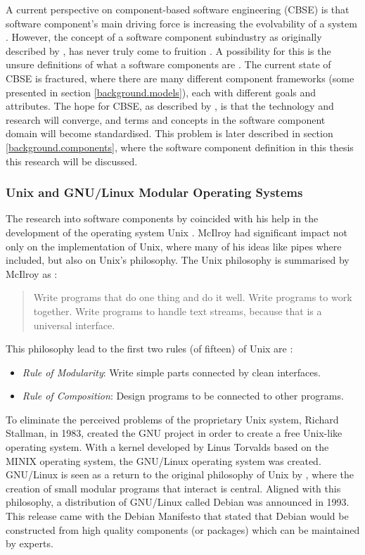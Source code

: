 A current perspective on component-based software engineering (CBSE) is that software component's main driving force is increasing the evolvability of a system \citep{Szyperski2000}.
However, the concept of a software component subindustry as originally described by \cite{McIlroy1969}, has never truly come to fruition \citep{Szyperski2002}.
A possibility for this is the unsure definitions of what a software components are \citep{Crnkovic2011}.
The current state of CBSE is fractured, where there are many different component frameworks (some presented in section \ref{background.models}),
each with different goals and attributes.
The hope for CBSE, as described by \cite{Crnkovic2011}, is that the technology and research will converge, and terms and concepts in the software component domain will become standardised.
This problem is later described in section \ref{background.components}, where the software component definition in this thesis this research will be discussed.

\subsubsection{Unix and GNU/Linux Modular Operating Systems}
The research into software components by \cite{McIlroy1969} coincided with his help in the development of the operating system Unix \citep{raymond2003art}. 
McIlroy had significant impact not only on the implementation of Unix, where many of his ideas like pipes where included,
but also on Unix's philosophy. 
The Unix philosophy is summarised by McIlroy as \citep{Salus1994}:
\begin{quote}
Write programs that do one thing and do it well. Write programs to work together. 
Write programs to handle text streams, because that is a universal interface.
\end{quote}

This philosophy lead to the first two rules (of fifteen) of Unix are \citep{raymond2003art}:
\begin{itemize}
  \item \textit{Rule of Modularity}: Write simple parts connected by clean interfaces.
  \item \textit{Rule of Composition}: Design programs to be connected to other programs.
\end{itemize} 

To eliminate the perceived problems of the proprietary Unix system, Richard Stallman, in 1983, created the GNU project \citep{stallman1985gnu} in order to create a free Unix-like operating system.
With a kernel developed by Linus Torvalds based on the MINIX \citep{tanenbaum1989minix} operating system, the GNU/Linux \citep{torvalds2002just} operating system was created.
GNU/Linux is seen as a return to the original philosophy of Unix by \cite{Gancarz2003}, where the creation of small modular programs that interact is central.
Aligned with this philosophy, a distribution of GNU/Linux called Debian \citep{Barth2005} was announced in 1993.
This release came with the Debian Manifesto \citep{murdock1994brief} 
that stated that Debian would be constructed from high quality components (or packages) which can be maintained by experts.


